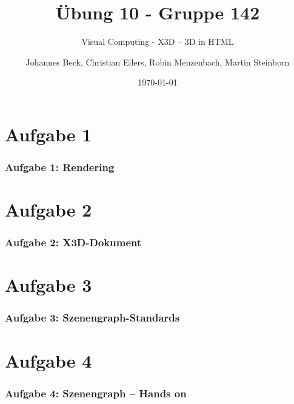 \documentclass[accentcolor=tud9c,colorbacktitle,inverttitle,landscape,german,presentation,t]{tudbeamer}
\begin{document}
\title{\"Ubung 10 - Gruppe 142} 
\subtitle{Visual Computing - X3D – 3D in HTML} 

\author[Johannes Beck, Christian Eilers, Robin Menzenbach, Martin Steinborn]{Johannes Beck, Christian Eilers, Robin Menzenbach, Martin Steinborn}


\date{\today}

\begin{titleframe}
\end{titleframe}

\section{Aufgabe 1}
	\begin{frame}
		\frametitle{Aufgabe 1: Rendering}
	\end{frame}

\section{Aufgabe 2}
\begin{frame}
	\frametitle{Aufgabe 2: X3D-Dokument}
\end{frame}

\section{Aufgabe 3}
\begin{frame}
	\frametitle{Aufgabe 3: Szenengraph-Standards}
\end{frame}

\section{Aufgabe 4}
\begin{frame}
	\frametitle{Aufgabe 4: Szenengraph – Hands on}
\end{frame}
\end{document}
